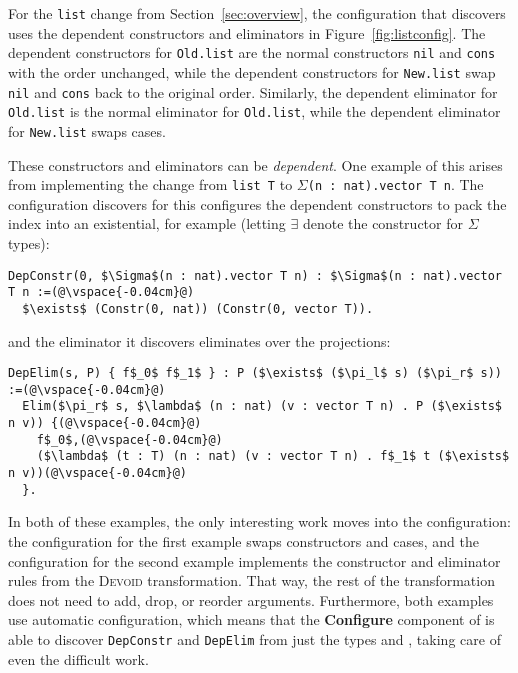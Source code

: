 For the \lstinline{list} change from Section~\ref{sec:overview},
the configuration that \toolname discovers uses the dependent constructors
and eliminators in Figure~\ref{fig:listconfig}. The dependent constructors for \lstinline{Old.list}
are the normal constructors \lstinline{nil} and \lstinline{cons} with the order unchanged,
while the dependent constructors for \lstinline{New.list} swap \lstinline{nil} and \lstinline{cons}
back to the original order.
Similarly, the dependent eliminator for \lstinline{Old.list} is the normal eliminator for \lstinline{Old.list},
while the dependent eliminator for \lstinline{New.list} swaps cases.

These constructors and eliminators can be \textit{dependent}.
One example of this arises from implementing the change from \lstinline{list T} to $\Sigma$\lstinline{(n : nat).vector T n}.
The configuration \toolname discovers for this configures the dependent constructors to pack the index into an existential, for example (letting $\exists$ denote the constructor for $\Sigma$ types):

\begin{lstlisting}
DepConstr(0, $\Sigma$(n : nat).vector T n) : $\Sigma$(n : nat).vector T n :=(@\vspace{-0.04cm}@)
  $\exists$ (Constr(0, nat)) (Constr(0, vector T)).
\end{lstlisting}
and the eliminator it discovers eliminates over the projections:

\begin{lstlisting}
DepElim(s, P) { f$_0$ f$_1$ } : P ($\exists$ ($\pi_l$ s) ($\pi_r$ s)) :=(@\vspace{-0.04cm}@)
  Elim($\pi_r$ s, $\lambda$ (n : nat) (v : vector T n) . P ($\exists$ n v)) {(@\vspace{-0.04cm}@)
    f$_0$,(@\vspace{-0.04cm}@)
    ($\lambda$ (t : T) (n : nat) (v : vector T n) . f$_1$ t ($\exists$ n v))(@\vspace{-0.04cm}@)
  }. 
\end{lstlisting}

In both of these examples, the only interesting work moves into the configuration:
the configuration for the first example swaps constructors and cases,
and the configuration for the second example implements the constructor and eliminator rules from the \textsc{Devoid} transformation.
That way, the rest of the \toolname transformation does not need to add, drop, or reorder arguments.
Furthermore, both examples use automatic configuration, which means that the \textbf{Configure} component of \toolname is able to 
discover \lstinline{DepConstr} and \lstinline{DepElim} from just the types \A and \B, taking care of even the difficult work.

